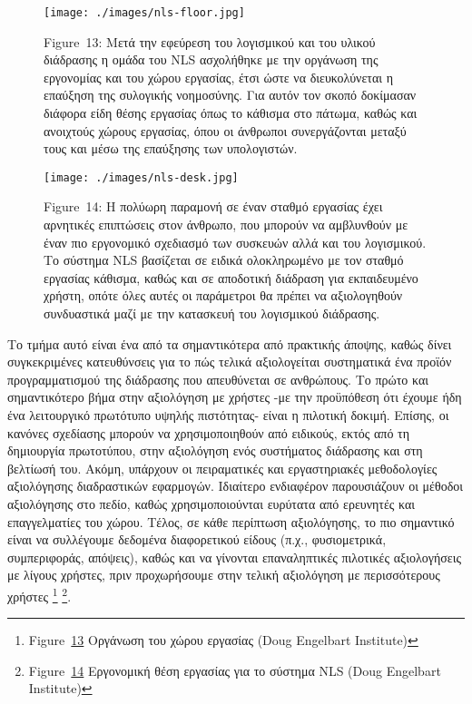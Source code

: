 \documentclass[
]{article}
\begin{document}
\leavevmode{}%
\begin{figure}
\hypertarget{fig:nls-floor}{%
\centering
\texttt{[image: ./images/nls-floor.jpg]}
\caption{Figure~13: Μετά την εφεύρεση του λογισμικού και του υλικού
διάδρασης η ομάδα του NLS ασχολήθηκε με την οργάνωση της εργονομίας και
του χώρου εργασίας, έτσι ώστε να διευκολύνεται η επαύξηση της συλογικής
νοημοσύνης. Για αυτόν τον σκοπό δοκίμασαν διάφορα είδη θέσης εργασίας
όπως το κάθισμα στο πάτωμα, καθώς και ανοιχτούς χώρους εργασίας, όπου οι
άνθρωποι συνεργάζονται μεταξύ τους και μέσω της επαύξησης των
υπολογιστών.}\label{fig:nls-floor}
}
\end{figure}

\leavevmode{}%
\begin{figure}
\hypertarget{fig:nls-desk}{%
\centering
\texttt{[image: ./images/nls-desk.jpg]}
\caption{Figure~14: Η πολύωρη παραμονή σε έναν σταθμό εργασίας έχει
αρνητικές επιπτώσεις στον άνθρωπο, που μπορούν να αμβλυνθούν με έναν πιο
εργονομικό σχεδιασμό των συσκευών αλλά και του λογισμικού. Το σύστημα
NLS βασίζεται σε ειδικά ολοκληρωμένο με τον σταθμό εργασίας κάθισμα,
καθώς και σε αποδοτική διάδραση για εκπαιδευμένο χρήστη, οπότε όλες
αυτές οι παράμετροι θα πρέπει να αξιολογηθούν συνδυαστικά μαζί με την
κατασκευή του λογισμικού διάδρασης.}\label{fig:nls-desk}
}
\end{figure}

Το τμήμα αυτό είναι ένα από τα σημαντικότερα από πρακτικής άποψης, καθώς
δίνει συγκεκριμένες κατευθύνσεις για το πώς τελικά αξιολογείται
συστηματικά ένα προϊόν προγραμματισμού της διάδρασης που απευθύνεται σε
ανθρώπους. Το πρώτο και σημαντικότερο βήμα στην αξιολόγηση με χρήστες
-με την προϋπόθεση ότι έχουμε ήδη ένα λειτουργικό πρωτότυπο υψηλής
πιστότητας- είναι η πιλοτική δοκιμή. Επίσης, οι κανόνες σχεδίασης
μπορούν να χρησιμοποιηθούν από ειδικούς, εκτός από τη δημιουργία
πρωτοτύπου, στην αξιολόγηση ενός συστήματος διάδρασης και στη βελτίωσή
του. Ακόμη, υπάρχουν οι πειραματικές και εργαστηριακές μεθοδολογίες
αξιολόγησης διαδραστικών εφαρμογών. Ιδιαίτερο ενδιαφέρον παρουσιάζουν οι
μέθοδοι αξιολόγησης στο πεδίο, καθώς χρησιμοποιούνται ευρύτατα από
ερευνητές και επαγγελματίες του χώρου. Τέλος, σε κάθε περίπτωση
αξιολόγησης, το πιο σημαντικό είναι να συλλέγουμε δεδομένα διαφορετικού
είδους (π.χ., φυσιομετρικά, συμπεριφοράς, απόψεις), καθώς και να
γίνονται επαναληπτικές πιλοτικές αξιολογήσεις με λίγους χρήστες, πριν
προχωρήσουμε στην τελική αξιολόγηση με περισσότερους χρήστες \footnote{Figure~\protect\hyperlink{fig:nls-floor}{13}
  Οργάνωση του χώρου εργασίας (Doug Engelbart Institute)} \footnote{Figure~\protect\hyperlink{fig:nls-desk}{14}
  Εργονομική θέση εργασίας για το σύστημα NLS (Doug Engelbart Institute)}.
\end{document}
